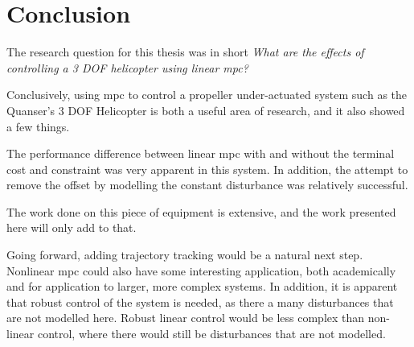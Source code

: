 \chapter{Conclusion}

The research question for this thesis was in short \textit{What are the effects of controlling a 3 DOF helicopter using linear \acrlong{mpc}?}

Conclusively, using \acrshort{mpc} to control a propeller under-actuated system such as the Quanser's 3 DOF Helicopter is both a useful area of research, and it also showed a few things. 

The performance difference between linear \acrlong{mpc} with and without the terminal cost and constraint was very apparent in this system. In addition, the attempt to remove the offset by modelling the constant disturbance was relatively successful. 

The work done on this piece of equipment is extensive, and the work presented here will only add to that. 

Going forward, adding trajectory tracking would be a natural next step. Nonlinear \acrlong{mpc} could also have some interesting application, both academically and for application to larger, more complex systems. In addition, it is apparent that robust control of the system is needed, as there a many disturbances that are not modelled here. Robust linear control would be less complex than non-linear control, where there would still be disturbances that are not modelled. 
